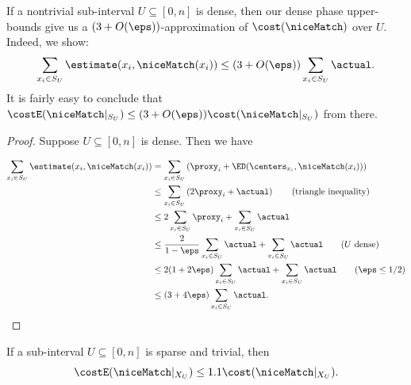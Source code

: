 \begin{lemma}
    \label{lem:dense-approx}
    If a nontrivial sub-interval $U \subseteq [0, n]$ is dense, then our dense phase upper-bounds give us a $(3+O(\eps))$-approximation of $\cost(\niceMatch)$ over $U$. Indeed, we show:
    $$\sum_{x_i \in S_U}\estimate(x_i, \niceMatch(x_i)) \leq (3+O(\eps))\sum_{x_i \in S_U}\actual.$$
    It is fairly easy to conclude that $\costE(\niceMatch|_{S_U}) \leq (3+O(\eps)) \cost(\niceMatch|_{S_U})$ from there.
\end{lemma}

\begin{proof}
    Suppose $U \subseteq [0, n]$ is dense. Then we have
    
    \begin{align}
    \sum_{x_i \in S_U}\estimate(x_i, \niceMatch(x_i)) &= \sum_{x_i \in S_U}\left(\proxy_i + \ED(\centers_{x_i}, \niceMatch(x_i))\right) \nonumber\\ 
    &\leq \sum_{x_i \in S_U}\left(2\proxy_i + \actual\right) \tag{triangle inequality}\\
    &\leq 2\sum_{x_i \in S_U}\proxy_i + \sum_{x_i \in S_U}\actual \nonumber\\
    &\leq \frac{2}{1-\eps}\sum_{x_i \in S_U}\actual + \sum_{x_i \in S_U}\actual \tag{$U$ dense}\\
    &\leq 2(1+2\eps)\sum_{x_i \in S_U}\actual + \sum_{x_i \in S_U}\actual \tag{$\eps \leq 1/2$}\\
    &\leq (3+4\eps)\sum_{x_i \in S_U}\actual. \nonumber
    \end{align}
\end{proof}

\begin{lemma}
    If a sub-interval $U \subseteq [0, n]$ is sparse and trivial, then 
    $$\costE(\niceMatch|_{X_U}) \leq 1.1 \cost(\niceMatch|_{X_U}).$$
\end{lemma}

